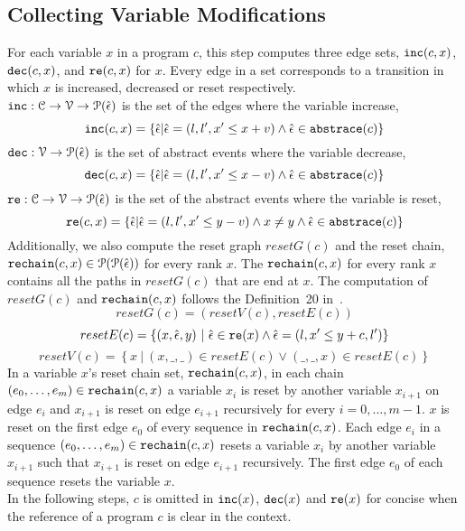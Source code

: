   \subsection{Collecting Variable Modifications}
  For each variable $x$ in a program $c$, this step computes three edge sets, $\mathtt{inc}(c, x)$, $\mathtt{dec}(c, x)$,
  and $\mathtt{re}(c, x)$ for $x$.
  Every edge in a set corresponds to a transition in which $x$ is increased,
  decreased
  or reset
  respectively.
  \\
  $\mathtt{inc}: \mathcal{C} \to \mathcal{V} \to \mathcal{P}(\hat{\mathtt{\epsilon}{}}) $
  is the set of the edges where the variable increase, 
  \[ \inc(c, x) = \left\{ \absevent | \absevent = (l, l', x' \leq x + v) \land \absevent \in \absflow(c) \right\} \]
  $\mathtt{dec}: \mathcal{V} \to \mathcal{P}(\hat{\mathtt{\epsilon}{}}) $
  is the set of abstract events where the variable decrease,
  \[\dec(c, x) = \left\{\absevent| \absevent = (l, l', x' \leq x - v) \land \absevent \in \absflow(c) \right\}\]
  $\mathtt{re}: \mathcal{C} \to \mathcal{V} \to \mathcal{P}(\hat{\mathtt{\epsilon}{}}) $ is the set of the abstract events where the variable is reset,
%
  \[\reset(c, x) = \left\{ \absevent| \absevent = (l, l', x' \leq y - v) \land x \neq y \land \absevent \in \absflow(c) \right\}\]
  Additionally,
  we also compute the reset graph $resetG(c)$ and the reset chain, $\mathtt{rechain}(c, x) \in \mathcal{P}(\mathcal{P}(\hat{\mathtt{\epsilon}{}}))$ for every rank $x$.
  The $\mathtt{rechain}(c, x)$ for every rank $x$ contains all the paths in $resetG(c)$ that are end at $x$.
  The computation of $resetG(c)$ and $\mathtt{rechain}(c, x)$ follows the Definition~20 in~\cite{sinn2017complexity}.
  \[resetG(c) = (resetV(c), resetE(c))\]
  \[resetE(c) = \left\{ (x, \absevent, y) ~\vert~ \absevent \in \reset(x) \land \absevent = (l, x' \leq y + c, l') \right\} \]
  \[resetV(c) = \left\{ x ~\vert~ (x, \_, \_) \in resetE(c) \lor (\_, \_, x) \in resetE(c) \right\} \]
  In a variable $x$'s reset chain set, $\mathtt{rechain}(c, x)$, in each chain $(e_0, \ldots, e_m) \in \mathtt{rechain}(c, x)$
  a variable $x_i$ is reset by another variable $x_{i + 1}$ on edge $e_{i}$
  and $x_{i + 1}$ is reset on edge $e_{i + 1}$ recursively
  for every $i = 0, \ldots, m - 1$.
  $x$ is reset on the first edge $e_0$ of every sequence in $\mathtt{rechain}(c, x)$.
  {Each edge $e_i$ in a sequence $(e_0, \ldots, e_m) \in \mathtt{rechain}(c, x)$
  resets a variable $x_i$ by another variable $x_{i + 1}$ such that $x_{i + 1}$
  is reset on edge $e_{i + 1}$ recursively. The first edge $e_0$ of each sequence resets the variable $x$.}
  \\
  In the following steps, $c$ is omitted in $\mathtt{inc}(x)$,
  $\mathtt{dec}(x)$ and $\mathtt{re}(x)$ for concise when the reference of a program $c$ is clear in the context.

